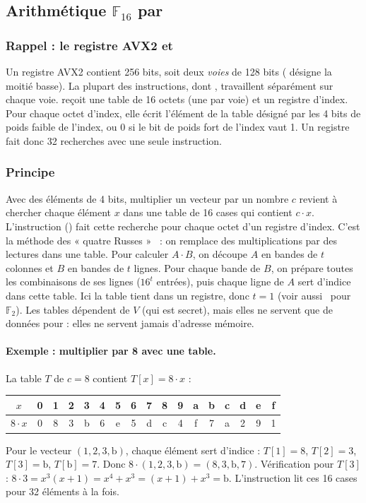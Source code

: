 \subsection{Arithmétique $\mathbb{F}_{16}$ par \vpshufb}\label{sec:arith}
\subsubsection{Rappel : le registre AVX2 et \vpshufb}
Un registre AVX2  contient 256 bits, soit deux \emph{voies} de 128 bits ( désigne la moitié basse). La plupart des instructions, dont \vpshufb, travaillent séparément sur chaque voie. \vpshufb{} reçoit une table de 16 octets (une par voie) et un registre d'index. Pour chaque octet d'index, elle écrit l'élément de la table désigné par les 4 bits de poids faible de l'index, ou 0 si le bit de poids fort de l'index vaut 1. Un registre  fait donc 32 recherches avec une seule instruction.

\subsubsection{Principe}
Avec des éléments de 4 bits, multiplier un vecteur par un nombre $c$ revient à chercher chaque élément $x$ dans une table de 16 cases qui contient $c\cdot x$. L'instruction \vpshufb{} () fait cette recherche pour chaque octet d'un registre d'index. C'est la méthode des « quatre Russes »~\cite{russes} : on remplace des multiplications par des lectures dans une table. Pour calculer $A\cdot B$, on découpe $A$ en bandes de $t$ colonnes et $B$ en bandes de $t$ lignes. Pour chaque bande de $B$, on prépare toutes les combinaisons de ses lignes ($16^t$ entrées), puis chaque ligne de $A$ sert d'indice dans cette table. Ici la table tient dans un registre, donc $t=1$ (voir aussi~\cite{albrecht2011} pour $\mathbb{F}_2$). Les tables dépendent de $V$ (qui est secret), mais elles ne servent que de données pour \vpshufb{} : elles ne servent jamais d'adresse mémoire.

\paragraph{Exemple : multiplier par 8 avec une table.} La table $T$ de $c=8$ contient $T[x]=8\cdot x$ :
\begin{center}\small\begin{tabular}{@{}c|cccccccccccccccc@{}}
$x$&0&1&2&3&4&5&6&7&8&9&a&b&c&d&e&f\\\hline
$8\cdot x$&0&8&3&b&6&e&5&d&c&4&f&7&a&2&9&1
\end{tabular}\end{center}
Pour le vecteur $(1,2,3,\mathrm{b})$, chaque élément sert d'indice : $T[1]=8$, $T[2]=3$, $T[3]=\mathrm{b}$, $T[\mathrm{b}]=7$. Donc $8\cdot(1,2,3,\mathrm{b})=(8,3,\mathrm{b},7)$. Vérification pour $T[3]$ : $8\cdot3=x^3(x+1)=x^4+x^3=(x+1)+x^3=\mathrm{b}$. L'instruction \vpshufb{} lit ces 16 cases pour 32 éléments à la fois.

